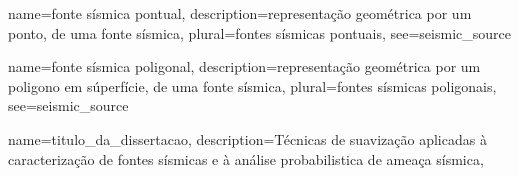 {
	name={fonte sísmica pontual},
	description={representação geométrica por um ponto, de uma fonte sísmica},
	plural={fontes sísmicas pontuais},
	see={seismic_source}	
}


{
	name={fonte sísmica poligonal},
	description={representação geométrica por um poligono em súperfície, 
				 de uma fonte sísmica},
	plural={fontes sísmicas poligonais},
	see={seismic_source}	
}

{
	name={titulo_da_dissertacao},
	description={Técnicas de suavização aplicadas
					à caracterização de fontes sísmicas e 
					à análise probabilistica de ameaça sísmica},
}

